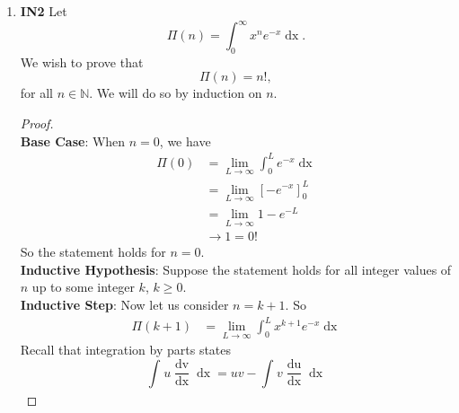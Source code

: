 \documentclass[12pt,oneside]{book}
\begin{document}
\begin{enumerate}
\begin{proof}
            \textbf{Inductive Hypothesis}: Suppose the statement holds for all integer values of $n$ up to some integer $k$, $k \geq 1$. \\
            \textbf{Inductive Step}: Now let us consider $n = k + 1$. So \begin{align*}
                a_{k+1} &= 3 a_k + 4 \\
                &= 3 \left( 3^k - 2 \right) + 4\\
                &= 3^{k+1} - 6 + 4 \\
                &= 3^{k + 1} - 2.
            \end{align*} 
            So, the statement holds for $n = k + 1$. By the principle of mathematical induction, the statement holds for all $n \in \mathbb{Z}^+$.
        \end{proof}
        \item \textbf{IN2} Let \[
            \Pi(n) = \int_{0}^{\infty} x^n e^{-x} \mathop{\mathrm{d}x}   
        .\] We wish to prove that \[
            \Pi(n) = n!
        ,\] for all $n \in \mathbb{N}$. We will do so by induction on $n$. 
        \begin{proof} \hspace{1mm} \\
            \textbf{Base Case}: When $n = 0$, we have \begin{align*}
                \Pi(0) &= \lim_{L \to \infty}  \int_{0}^{L} e^{-x} \mathop{\mathrm{d}x} \\ 
                &= \lim_{L \to \infty}  \left[ - e^{-x} \right]_0^{L} \\
                &= \lim_{L \to \infty} 1 - e^{-L} \\
                &\to 1 = 0!  
            \end{align*}
            So the statement holds for $n = 0$. \\
            \textbf{Inductive Hypothesis}: Suppose the statement holds for all integer values of $n$ up to some integer $k$, $k \geq 0$. \\
            \textbf{Inductive Step}: Now let us consider $n = k + 1$. So \begin{align*}
                \Pi(k+1) &= \lim_{L \to \infty} \int_{0}^{L} x^{k + 1}e^{-x} \mathop{\mathrm{d}x}  
            \end{align*} Recall that integration by parts states \[
                \int_{}^{} u \frac{\mathop{\mathrm{d}v}}{\mathop{\mathrm{d}x}} \mathop{\mathrm{d}x} = uv - \int_{}^{} v \frac{\mathop{\mathrm{d}u}}{\mathop{\mathrm{d}x}} \mathop{\mathrm{d}x}   
\]
\end{proof}
\end{enumerate}
\end{document}
